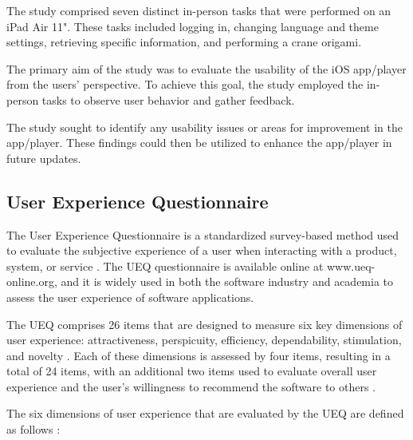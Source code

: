 \documentclass[conference,onecolumn]{IEEEtran}
\begin{document}
            The study comprised seven distinct in-person tasks that were performed on an iPad Air 11". These tasks included logging in, changing language and theme settings, retrieving specific information, and performing a crane origami.

            The primary aim of the study was to evaluate the usability of the iOS app/player from the users' perspective. To achieve this goal, the study employed the in-person tasks to observe user behavior and gather feedback.
            
            The study sought to identify any usability issues or areas for improvement in the app/player. These findings could then be utilized to enhance the app/player in future updates.
                
    \subsection{User Experience Questionnaire}
    
        The User Experience Questionnaire is a standardized survey-based method used to evaluate the subjective experience of a user when interacting with a product, system, or service \cite{brooke1996sus}. The UEQ questionnaire is available online at www.ueq-online.org, and it is widely used in both the software industry and academia to assess the user experience of software applications.

        The UEQ comprises 26 items that are designed to measure six key dimensions of user experience: attractiveness, perspicuity, efficiency, dependability, stimulation, and novelty \cite{hassenzahl2006user}. Each of these dimensions is assessed by four items, resulting in a total of 24 items, with an additional two items used to evaluate overall user experience and the user's willingness to recommend the software to others \cite{laugwitz2008construction}.

        The six dimensions of user experience that are evaluated by the UEQ are defined as follows \cite{hassenzahl2003attrakdiff}:
\end{document}
